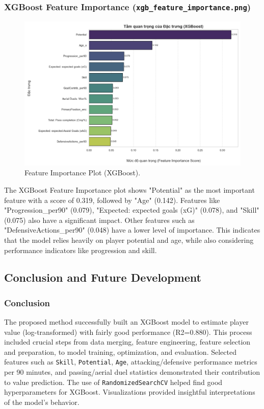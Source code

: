 \documentclass[12pt, a4paper]{report}
\begin{document}
\subsubsection*{XGBoost Feature Importance (\texttt{xgb\_feature\_importance.png})}
\begin{figure}[H]
    \centering
    \includegraphics[width=\textwidth]{xgb_feature_importance.png}
    \caption{Feature Importance Plot (XGBoost).}
    \label{fig:xgb_feature_importance}
\end{figure}

The XGBoost Feature Importance plot shows "Potential" as the most important feature with a score of 0.319, followed by "Age" (0.142).
Features like "Progression\_per90" (0.079), "Expected: expected goals (xG)" (0.078), and "Skill" (0.075) also have a significant impact.
Other features such as "DefensiveActions\_per90" (0.048) have a lower level of importance.
This indicates that the model relies heavily on player potential and age, while also considering performance indicators like progression and skill.

\subsection{Conclusion and Future Development}
\subsubsection*{Conclusion}
The proposed method successfully built an XGBoost model to estimate player value (log-transformed) with fairly good performance (R2=0.880). This process included crucial steps from data merging, feature engineering, feature selection and preparation, to model training, optimization, and evaluation. Selected features such as \texttt{Skill}, \texttt{Potential}, \texttt{Age}, attacking/defensive performance metrics per 90 minutes, and passing/aerial duel statistics demonstrated their contribution to value prediction. The use of \texttt{RandomizedSearchCV} helped find good hyperparameters for XGBoost. Visualizations provided insightful interpretations of the model's behavior.
\end{document}
